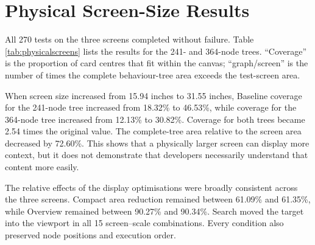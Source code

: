 \section{Physical Screen-Size Results}

All 270 tests on the three screens completed without failure. Table \ref{tab:physicalscreens} lists the results for the 241- and 364-node trees. ``Coverage'' is the proportion of card centres that fit within the canvas; ``graph/screen'' is the number of times the complete behaviour-tree area exceeds the test-screen area.

\begin{table}[htbp]
\centering
\caption{Complex-tree coverage on three physical screen sizes. Resolution is audit metadata, not an experimental treatment.}
\label{tab:physicalscreens}
\small
{}
\end{table}

When screen size increased from 15.94 inches to 31.55 inches, Baseline coverage for the 241-node tree increased from 18.32\% to 46.53\%, while coverage for the 364-node tree increased from 12.13\% to 30.82\%. Coverage for both trees became 2.54 times the original value. The complete-tree area relative to the screen area decreased by 72.60\%. This shows that a physically larger screen can display more context, but it does not demonstrate that developers necessarily understand that content more easily.

The relative effects of the display optimisations were broadly consistent across the three screens. Compact area reduction remained between 61.09\% and 61.35\%, while Overview remained between 90.27\% and 90.34\%. Search moved the target into the viewport in all 15 screen--scale combinations. Every condition also preserved node positions and execution order.

